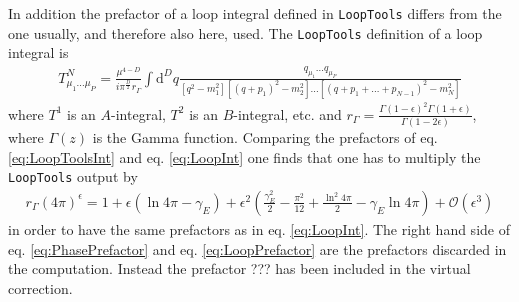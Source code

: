 In addition the prefactor of a loop integral defined in \texttt{LoopTools} differs from the one usually, and therefore also here, used. The \texttt{LoopTools} definition\cite{LoopToolsManual} of a loop integral is 
\begin{align}
T^N_{\mu_1\hdots\mu_P} = \frac{\mu^{4-D}}{i\pi^{\frac{D}{2}}r_\Gamma}\int\mathrm{d}^Dq\frac{q_{\mu_1} \hdots q_{\mu_P}}{[q^2-m_1^2] [(q+p_1)^2-m_2^2] \hdots [(q+p_1+ \hdots +p_{N-1})^2-m_N^2]}\label{eq:LoopToolsInt}
\end{align}
where $T^1$ is an $A$-integral, $T^2$ is an $B$-integral, etc. and $r_\Gamma = \frac{\Gamma(1-\epsilon)^2\Gamma(1+\epsilon)}{\Gamma(1-2\epsilon)}$, where $\Gamma(z)$ is the Gamma function. Comparing the prefactors of eq. \eqref{eq:LoopToolsInt} and eq.  \eqref{eq:LoopInt} one finds that one has to multiply the \texttt{LoopTools} output by
\begin{align}
r_\Gamma (4\pi)^\epsilon = 1 + \epsilon(\ln 4\pi -\gamma_E) + \epsilon^2\left( \frac{\gamma_E^2}{2} - \frac{\pi^2}{12} + \frac{\ln^2 4\pi}{2} - \gamma_E\ln 4\pi \right) + \mathcal{O}(\epsilon^3)\label{eq:LoopPrefactor}
\end{align}
in order to have the same prefactors as in eq. \eqref{eq:LoopInt}. The right hand side of eq. \eqref{eq:PhasePrefactor} and eq. \eqref{eq:LoopPrefactor} are the prefactors discarded in the computation. Instead the prefactor ??? has been included in the virtual correction.


